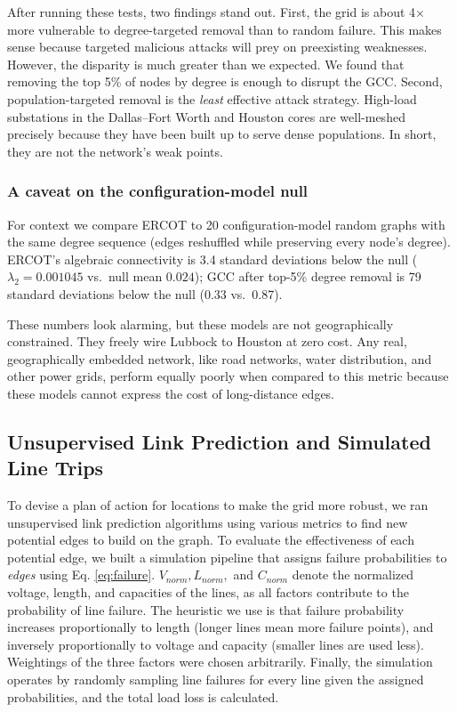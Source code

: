 \documentclass[12pt,letterpaper]{article}
\begin{document}
After running these tests, two findings stand out. First, the grid is about 4$\times$ more vulnerable to degree-targeted removal than to random failure. This makes sense because targeted malicious attacks will prey on preexisting weaknesses. However, the disparity is much greater than we expected. We found that removing the top 5\% of nodes by degree is enough to disrupt the GCC. Second, population-targeted removal is the \emph{least} effective attack strategy. High-load substations in the Dallas--Fort Worth and Houston cores are well-meshed precisely because they have been built up to serve dense populations. In short, they are not the network's weak points.

\subsubsection*{A caveat on the configuration-model null}

For context we compare ERCOT to 20 configuration-model random graphs with the same degree sequence (edges reshuffled while preserving every node's degree). ERCOT's algebraic connectivity is 3.4 standard deviations below the null ($\lambda_2 = 0.001045$ vs.\ null mean $0.024$); GCC after top-5\% degree removal is 79 standard deviations below the null (0.33 vs.\ 0.87).

These numbers look alarming, but these models are not geographically constrained. They freely wire Lubbock to Houston at zero cost. Any real, geographically embedded network, like road networks, water distribution, and other power grids, perform equally poorly when compared to this metric because these models cannot express the cost of long-distance edges.

\subsection{Unsupervised Link Prediction and Simulated Line Trips}
To devise a plan of action for locations to make the grid more robust, we ran unsupervised link prediction algorithms using various metrics to find new potential edges to build on the graph. To evaluate the effectiveness of each potential edge, we built a simulation pipeline that assigns failure probabilities to \textit{edges} using Eq. \ref{eq:failure}. $V_{norm}, L_{norm},$ and $C_{norm}$ denote the normalized voltage, length, and capacities of the lines, as all factors contribute to the probability of line failure. The heuristic we use is that failure probability increases proportionally to length (longer lines mean more failure points), and inversely proportionally to voltage and capacity (smaller lines are used less). Weightings of the three factors were chosen arbitrarily. Finally, the simulation operates by randomly sampling line failures for every line given the assigned probabilities, and the total load loss is calculated.
\end{document}
